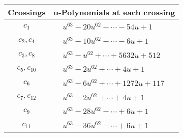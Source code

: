 \documentclass[1p]{elsarticle_modified}
\theoremstyle{definition}
\begin{document}
\begin{tabular}{m{50pt}|m{274pt}}
Crossings & \hspace{64pt}u-Polynomials at each crossing \\
\hline $$\begin{aligned}c_{1}\end{aligned}$$&$\begin{aligned}
&u^{63}+20 u^{62}+\cdots-54 u+1
\end{aligned}$\\
\hline $$\begin{aligned}c_{2},c_{4}\end{aligned}$$&$\begin{aligned}
&u^{63}-10 u^{62}+\cdots-6 u+1
\end{aligned}$\\
\hline $$\begin{aligned}c_{3},c_{8}\end{aligned}$$&$\begin{aligned}
&u^{63}+u^{62}+\cdots+5632 u+512
\end{aligned}$\\
\hline $$\begin{aligned}c_{5},c_{10}\end{aligned}$$&$\begin{aligned}
&u^{63}+2 u^{62}+\cdots+4 u+1
\end{aligned}$\\
\hline $$\begin{aligned}c_{6}\end{aligned}$$&$\begin{aligned}
&u^{63}+6 u^{62}+\cdots+1272 u+117
\end{aligned}$\\
\hline $$\begin{aligned}c_{7},c_{12}\end{aligned}$$&$\begin{aligned}
&u^{63}+2 u^{62}+\cdots+4 u+1
\end{aligned}$\\
\hline $$\begin{aligned}c_{9}\end{aligned}$$&$\begin{aligned}
&u^{63}+28 u^{62}+\cdots+6 u+1
\end{aligned}$\\
\hline $$\begin{aligned}c_{11}\end{aligned}$$&$\begin{aligned}
&u^{63}-36 u^{62}+\cdots+6 u+1
\end{aligned}$\\
\hline
\end{tabular}\\~\\
\end{document}
